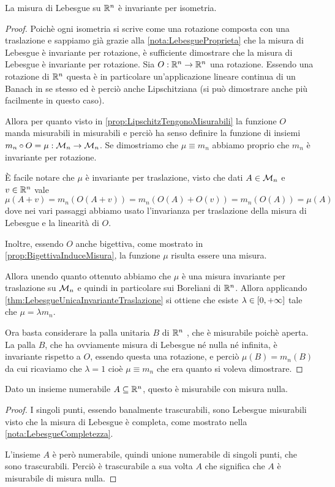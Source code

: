 \begin{proposition}\label{prop:LebesgueProprietaIsometria}
	La misura di Lebesgue su $\mathbb R^n$ è invariante per isometria.
\end{proposition}
\begin{proof}
	Poichè ogni isometria si scrive come una rotazione composta con una traslazione e sappiamo già grazie alla \cref{nota:LebesgueProprieta} che la misura di Lebesgue è invariante per rotazione, è sufficiente dimostrare che la misura di Lebesgue è invariante per rotazione.
	Sia $O:\mathbb R^n\to\mathbb R^n$ una rotazione. Essendo una rotazione di $\mathbb R^n$ questa è in particolare un'applicazione lineare continua di un Banach in se stesso ed è perciò anche Lipschitziana (si può dimostrare anche più facilmente in questo caso).
	
	Allora per quanto visto in \cref{prop:LipschitzTengonoMisurabili} la funzione $O$ manda misurabili in misurabili e perciò ha senso definire la funzione di insiemi $m_n \circ O=\mu:\mathcal M_n\to\mathcal M_n$. 
	Se dimostriamo che $\mu\equiv m_n$ abbiamo proprio che $m_n$ è invariante per rotazione.
	
	È facile notare che $\mu$ è invariante per traslazione, visto che dati $A\in \mathcal M_n$ e $v\in\mathbb R^n$ vale
	\begin{equation*}
		\mu(A+v)=m_n(O(A+v))=m_n(O(A)+O(v))=m_n(O(A))=\mu(A)
	\end{equation*}
	dove nei vari passaggi abbiamo usato l'invarianza per traslazione della misura di Lebesgue e la linearità di $O$.
	
	Inoltre, essendo $O$ anche bigettiva, come mostrato in \cref{prop:BigettivaInduceMisura}, la funzione $\mu$ risulta essere una misura.
	
	Allora unendo quanto ottenuto abbiamo che $\mu$ è una misura invariante per traslazione su $\mathcal M_n$ e quindi in particolare sui Boreliani di $\mathbb R^n$. Allora applicando \cref{thm:LebesgueUnicaInvarianteTraslazione} si ottiene che esiste $\lambda\in[0,+\infty]$ tale che $\mu=\lambda m_n$.
	
	Ora basta considerare la palla unitaria $B$ di $\mathbb R^n$ , che è misurabile poichè aperta.
	La palla $B$, che ha ovviamente misura di Lebesgue né nulla né infinita, è invariante rispetto a $O$, essendo questa una rotazione, e perciò $\mu(B)=m_n(B)$ da cui ricaviamo che $\lambda=1$ cioè $\mu\equiv m_n$ che era quanto si voleva dimostrare.
\end{proof}

\begin{proposition}\label{NumerabiliLebesgueTrascurabili}
	Dato un insieme numerabile $A\subseteq\mathbb R^n$, questo è misurabile con misura nulla.
\end{proposition}
\begin{proof}
	I singoli punti, essendo banalmente trascurabili, sono Lebesgue misurabili visto che la misura di Lebesgue è completa, come mostrato nella \cref{nota:LebesgueCompletezza}.
	
	L'insieme $A$ è però numerabile, quindi unione numerabile di singoli punti, che sono trascurabili. Perciò è trascurabile a sua volta $A$ che significa che $A$ è misurabile di misura nulla.
\end{proof}

